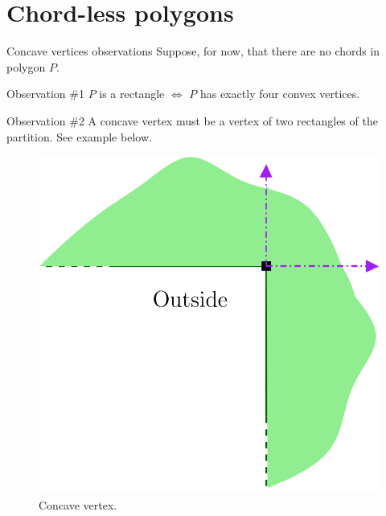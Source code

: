 \documentclass{beamer}
\begin{document}
\section{Chord-less polygons}

\begin{frame}[t]{Concave vertices observations}	
	Suppose, for now, that there are no chords in polygon $P$.

	\begin{block}{Observation \#1}
	$P$ is a rectangle $\iff$ $P$ has exactly four convex vertices.
	\end{block}  

	\begin{block}{Observation \#2}
	A concave vertex must be a vertex of two rectangles of the partition. See example below.
	\end{block}  
\begin{figure}

\centering
  \includegraphics[width=.6\textwidth]{"./direccio.png"}
  \caption{Concave vertex.}
     \label{fig:question}
\end{figure}


\end{frame}
\end{document}
